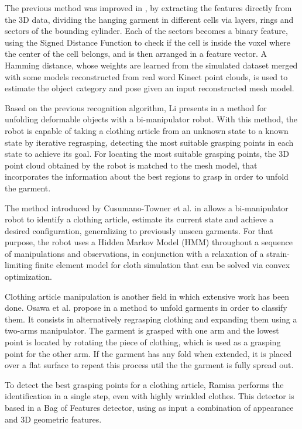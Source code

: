 The previous method was improved in \cite{Li2014IROS}, by extracting the features directly from the 3D data, dividing the hanging garment in different cells via layers, rings and sectors of the bounding cylinder. Each of the sectors becomes a binary feature, using the Signed Distance Function to check if the cell is inside the voxel where the center of the cell belongs, and is then arranged in a feature vector. A Hamming distance, whose weights are learned from the simulated dataset merged with some models reconstructed from real word Kinect point clouds, is used to estimate the object category and pose given an input reconstructed mesh model.

Based on the previous recognition algorithm, Li presents in \cite{Li2015ICRA} a method for unfolding deformable objects with a bi-manipulator robot. With this method, the robot is capable of taking a clothing article from an unknown state to a known state by iterative regrasping, detecting the most suitable grasping points in each state to achieve its goal. For locating the most suitable grasping points, the 3D point cloud obtained by the robot is matched to the mesh model, that incorporates the information about the best regions to grasp in order to unfold the garment.

The method introduced by Cusumano-Towner et al. in \cite{Cusumano-Towner2011} allows a bi-manipulator robot to identify a clothing article, estimate its current state and achieve a desired configuration, generalizing to previously unseen garments. For that purpose, the robot uses a Hidden Markov Model (HMM) throughout a sequence of manipulations and observations, in conjunction with a relaxation of a strain-limiting finite element model for cloth simulation that can be solved via convex optimization.

Clothing article manipulation is another field in which extensive work has been done. Osawa et al. propose in \cite{Osawa2006} a method to unfold garments in order to classify them. It consists in alternatively regrasping clothing and expanding them using a two-arms manipulator. The garment is grasped with one arm and the lowest point is located by rotating the piece of clothing, which is used as a grasping point for the other arm. If the garment has any fold when extended, it is placed over a flat surface to repeat this process util the the garment is fully spread out.

To detect the best grasping points for a clothing article, Ramisa \cite{Ramisa2012} performs the identification in a single step, even with highly wrinkled clothes. This detector is based in a Bag of Features detector, using as input a combination of appearance and 3D geometric features.

